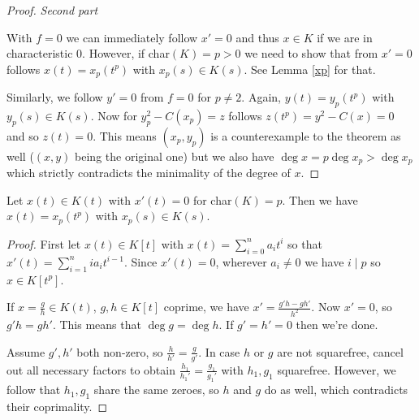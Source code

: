 \documentclass[english,11pt,a4paper]{article}
\begin{document}
\begin{theorem}
\begin{proof}
    \textit{Second part}

    With $f = 0$ we can immediately follow $x' = 0$ and thus $x \in K$ if we are in characteristic 0. However, if char$(K) = p > 0$ we need to show that from $x' = 0$ follows $x(t) = x_p(t^p)$ with $x_p(s) \in K(s)$. See Lemma \ref{xp} for that.

    Similarly, we follow $y' = 0$ from $f = 0$ for $p \neq 2$. Again, $y(t) = y_p(t^p)$ with $y_p(s) \in K(s)$. Now for $y_p^2 -C(x_p) = z$ follows $z(t^p) = y^2 - C(x) = 0$ and so $z(t) = 0$. This means $(x_p, y_p)$ is a counterexample to the theorem as well ($(x,y)$ being the original one) but we also have $\deg x = p \deg x_p > \deg x_p$ which strictly contradicts the minimality of the degree of $x$.
  \end{proof}
\end{theorem}

\begin{lemma}\label{xp}
  Let $x(t) \in K(t)$ with $x'(t) = 0$ for char$(K) = p$. Then we have $x(t) = x_p(t^p)$ with $x_p(s) \in K(s)$.
  \begin{proof}
    First let $x(t) \in K[t]$ with $x(t)= \sum_{i=0}^n a_i t^i$ so that $x'(t)= \sum_{i=1}^n i a_i t^{i-1}$. Since $x'(t) = 0$, wherever $a_i \neq 0$ we have $i \mid p$ so $x \in K[t^p]$.

    If $x = \frac g h \in K(t)$, $g, h \in K[t]$ coprime, we have $x' = \frac{g' h - g h'}{h^2}$. Now $x' = 0$, so $g'h = gh'$. This means that $\deg g = \deg h$. If $g' = h' = 0$ then we're done.%

    Assume $g', h'$ both non-zero, so $\frac{h}{h'} = \frac{g}{g'}$. In case $h$ or $g$ are not squarefree, cancel out all necessary factors to obtain $\frac{h_1}{h_1'} = \frac{g_1}{g_1'}$ with $h_1, g_1$ squarefree. However, we follow that $h_1, g_1$ share the same zeroes, so $h$ and $g$ do as well, which contradicts their coprimality.
  \end{proof}
\end{lemma}

\end{document}
